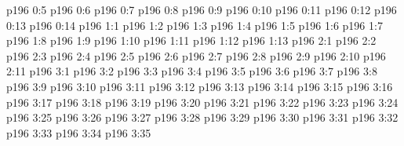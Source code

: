 \vs p196 0:5 
\vs p196 0:6 
\vs p196 0:7 
\vs p196 0:8 
\vs p196 0:9 
\vs p196 0:10 
\vs p196 0:11 
\vs p196 0:12 
\vs p196 0:13 
\vs p196 0:14 
\vs p196 1:1 
\vs p196 1:2 
\vs p196 1:3 \pc 
\vs p196 1:4 
\vs p196 1:5 
\vs p196 1:6 
\vs p196 1:7 
\vs p196 1:8 
\vs p196 1:9 
\vs p196 1:10 
\vs p196 1:11 
\vs p196 1:12 
\vs p196 1:13 
\vs p196 2:1 
\vs p196 2:2 
\vs p196 2:3 
\vs p196 2:4 
\vs p196 2:5 
\vs p196 2:6 \pc 
\vs p196 2:7 
\vs p196 2:8 
\vs p196 2:9 
\vs p196 2:10 
\vs p196 2:11 
\vs p196 3:1 
\vs p196 3:2 
\vs p196 3:3 
\vs p196 3:4 
\vs p196 3:5 
\vs p196 3:6 
\vs p196 3:7 
\vs p196 3:8 
\vs p196 3:9 
\vs p196 3:10 \pc 
\vs p196 3:11 
\vs p196 3:12 
\vs p196 3:13 
\vs p196 3:14 
\vs p196 3:15 \pc 
\vs p196 3:16 
\vs p196 3:17 
\vs p196 3:18 
\vs p196 3:19 
\vs p196 3:20 
\vs p196 3:21 
\vs p196 3:22 
\vs p196 3:23 
\vs p196 3:24 
\vs p196 3:25 
\vs p196 3:26 
\vs p196 3:27 
\vs p196 3:28 
\vs p196 3:29 \pc 
\vs p196 3:30 \pc 
\vs p196 3:31 \pc 
\vs p196 3:32 
\vs p196 3:33 
\vs p196 3:34 
\vs p196 3:35 
\quizlink
